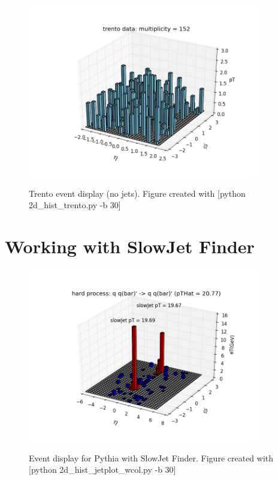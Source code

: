 \documentclass[11pt]{article}
\begin{document}
\begin{figure}[h]
\begin{center}
\includegraphics[width=0.9\textwidth]{2d_hist_trento.png}
\label{fig_label}
\caption{Trento event display (no jets).  Figure created with [python 2d\_hist\_trento.py -b 30]}
\end{center}
\end{figure}

\section{Working with SlowJet Finder}
%
%

\begin{figure}[h]
\begin{center}
\includegraphics[width=0.9\textwidth]{2d_hist_jetplot_wcol.png}
\label{fig_label}
\caption{Event display for Pythia with SlowJet Finder.  Figure created with [python 2d\_hist\_jetplot\_wcol.py -b 30]}
\end{center}
\end{figure}
\end{document}
